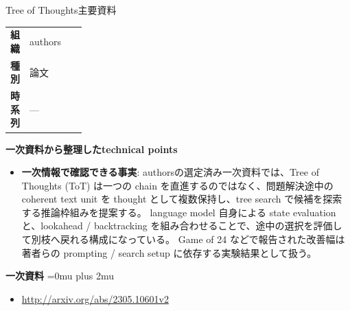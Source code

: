 \begin{technicalnote}{Tree of Thoughts}{主要資料}
\begingroup
\begin{tabularx}{\linewidth}{@{}>{\bfseries}p{0.22\linewidth}X@{}}
組織 & authors \\
種別 & 論文 \\
時系列 & — \\
\end{tabularx}
\smallskip
{\bfseries 一次資料から整理したtechnical points}
\begin{itemize}[leftmargin=1.5em,itemsep=0.35em]
\item \textbf{一次情報で確認できる事実}: authorsの選定済み一次資料では、Tree of Thoughts (ToT) は一つの chain を直進するのではなく、問題解決途中の coherent text unit を thought として複数保持し、tree search で候補を探索する推論枠組みを提案する。 language model 自身による state evaluation と、lookahead / backtracking を組み合わせることで、途中の選択を評価して別枝へ戻れる構成になっている。 Game of 24 などで報告された改善幅は著者らの prompting / search setup に依存する実験結果として扱う。
\end{itemize}
\begin{minipage}{\linewidth}
\begin{samepage}
{\bfseries 一次資料}
\begingroup\sloppy
\Urlmuskip=0mu plus 2mu\relax
\begin{itemize}[leftmargin=1.5em,itemsep=0.25em]
\item {\scriptsize\url{http://arxiv.org/abs/2305.10601v2}}
\end{itemize}
\endgroup
\end{samepage}
\end{minipage}
\endgroup
\end{technicalnote}
\medskip

